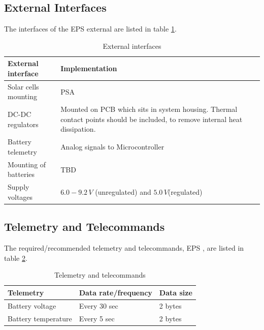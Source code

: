 \subsection{External Interfaces}
%
The interfaces of the \ac{EPS} external are listed in table \ref{tab:external_interfaces}.
%
\begin{table}[H]
\centering
\caption{External interfaces}
\label{tab:external_interfaces}
\begin{tabular}{m{}m{}}
\hline
\textbf{External interface} & \textbf{Implementation}\\
\hline
Solar cells mounting & \ac{PSA}\\[2mm]
DC-DC regulators & Mounted on PCB which sits in system housing. Thermal contact points should be included, to remove internal heat dissipation.\\[2mm]
Battery telemetry & Analog signals to Microcontroller\\[2mm]
Mounting of batteries & \ac{TBD}\\
Supply voltages & $6.0-9.2\,V$ (unregulated) and $5.0\,V$(regulated)\\[2mm]
\hline
\end{tabular}
\end{table}
%
%
\subsection{Telemetry and Telecommands}
%
The required/recommended telemetry and telecommands, \ac{EPS} , are listed in table \ref{tab:Telemetry_Telecommands}.
%
\begin{table}[H]
\centering
\caption{Telemetry and telecommands}
\label{tab:Telemetry_Telecommands}
\begin{tabular}{|l|l|l|}
\hline
\textbf{Telemetry} & \textbf{Data rate/frequency} & \textbf{Data size} \\
\hline
Battery voltage & Every 30 sec & 2 bytes\\
\hline
Battery temperature & Every 5 sec & 2 bytes\\
\hline
\end{tabular}
\end{table}